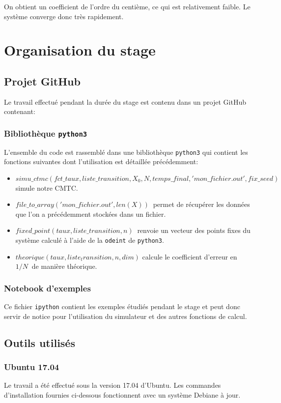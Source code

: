 \documentclass[a4paper,12pt]{report}
\def\D{\displaystyle}
\begin{document}
 On obtient un coefficient de l'ordre du centième, ce qui est
 relativement faible. Le système converge donc très rapidement.


\chapter{Organisation du stage}
\section{Projet GitHub}
 Le travail effectué pendant la durée du stage est contenu dans un
 projet GitHub\cite{librairie} contenant:
\subsection{Bibliothèque \texttt{python3}}
L'ensemble du code est rassemblé dans une bibliothèque \texttt{python3}
 qui
contient les fonctions suivantes dont l'utilisation est détaillée précédemment:
\begin{itemize}
  \item
    $\D simu\_ctmc(fct\_taux,liste\_transition,X_0,N,temps\_final,'mon\_fichier.out',fix\_seed)
    \ $
     simule notre CMTC.
  \item $\D file\_to\_array('mon\_fichier.out',len(X)) \ $  permet de
    récupérer les données que l'on a précédemment stockées dans un
    fichier.
  \item $\D fixed\_point(taux,liste\_transition,n) \ $  renvoie un vecteur
    des points fixes du système calculé à l'aide de la
    \texttt{odeint} de \texttt{python3}.
  \item $\D theorique(taux,liste_transition,n,dim)$  calcule le
    coefficient d'erreur en $\D 1/N \ $ de manière théorique.
\end{itemize}

\subsection{Notebook d'exemples}
Ce fichier \texttt{ipython} contient les exemples étudiés pendant le stage et
peut donc servir de notice pour l'utilisation du simulateur et des
autres fonctions de calcul. 

\section{Outils utilisés}

\subsection{Ubuntu 17.04}
Le travail a été effectué sous la version 17.04 d'Ubuntu. Les commandes
d'installation fournies ci-dessous fonctionnent avec un système Debiane à jour.
\end{document}
